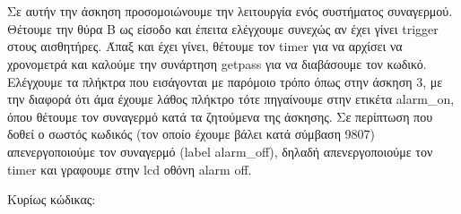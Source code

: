 \section{}
Σε αυτήν την άσκηση προσομοιώνουμε την λειτουργία ενός συστήματος συναγερμού.
Θέτουμε την θύρα Β ως είσοδο και έπειτα ελέγχουμε συνεχώς αν έχει γίνει
trigger στους αισθητήρες. Άπαξ και έχει γίνει, θέτουμε τον timer για να
αρχίσει να χρονομετρά και καλούμε την συνάρτηση getpass για να διαβάσουμε τον
κωδικό. Ελέγχουμε τα πλήκτρα που εισάγονται με παρόμοιο τρόπο όπως στην άσκηση
3, με την διαφορά ότι άμα έχουμε λάθος πλήκτρο τότε πηγαίνουμε στην ετικέτα
alarm\_on, όπου θέτουμε τον συναγερμό κατά τα ζητούμενα της άσκησης. Σε
περίπτωση που δοθεί ο σωστός κωδικός (τον οποίο έχουμε βάλει κατά σύμβαση
9807) απενεργοποιούμε τον συναγερμό (label alarm\_off), δηλαδή απενεργοποιούμε
τον timer και γραφουμε στην lcd οθόνη alarm off.

\noindent Κυρίως κώδικας:
\inputminted[linenos,obeytabs,fontsize=\footnotesize]{c}{files/part5.S}
